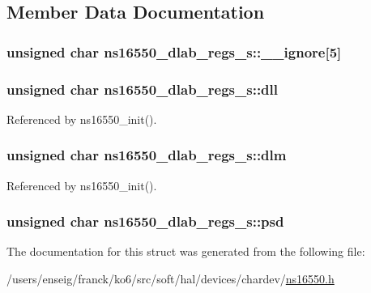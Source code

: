 \subsection{Member Data Documentation}
\hypertarget{structns16550__dlab__regs__s_a837b0aae8d55aa608895b0b173b162f1}{
\subsubsection[{\-\_\-\-\_\-ignore}]{\setlength{\rightskip}{0pt plus 5cm}unsigned char ns16550\-\_\-dlab\-\_\-regs\-\_\-s\-::\-\_\-\-\_\-ignore\mbox{[}5\mbox{]}}}\label{structns16550__dlab__regs__s_a837b0aae8d55aa608895b0b173b162f1}
\hypertarget{structns16550__dlab__regs__s_a643629364b1584ebfb558b01974ac799}{
\subsubsection[{dll}]{\setlength{\rightskip}{0pt plus 5cm}unsigned char ns16550\-\_\-dlab\-\_\-regs\-\_\-s\-::dll}}\label{structns16550__dlab__regs__s_a643629364b1584ebfb558b01974ac799}


Referenced by ns16550\-\_\-init().

\hypertarget{structns16550__dlab__regs__s_a5fdab6bd62f37d5bf79cc816acd32690}{
\subsubsection[{dlm}]{\setlength{\rightskip}{0pt plus 5cm}unsigned char ns16550\-\_\-dlab\-\_\-regs\-\_\-s\-::dlm}}\label{structns16550__dlab__regs__s_a5fdab6bd62f37d5bf79cc816acd32690}


Referenced by ns16550\-\_\-init().

\hypertarget{structns16550__dlab__regs__s_a6555166a4c6457022dd66d1b63d4e164}{
\subsubsection[{psd}]{\setlength{\rightskip}{0pt plus 5cm}unsigned char ns16550\-\_\-dlab\-\_\-regs\-\_\-s\-::psd}}\label{structns16550__dlab__regs__s_a6555166a4c6457022dd66d1b63d4e164}


The documentation for this struct was generated from the following file\-:\begin{DoxyCompactItemize}
\item 
/users/enseig/franck/ko6/src/soft/hal/devices/chardev/\hyperlink{ns16550_8h}{ns16550.\-h}\end{DoxyCompactItemize}
